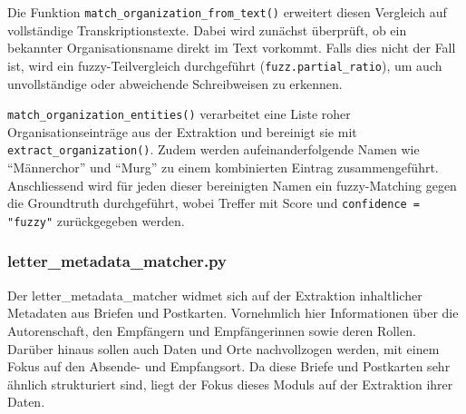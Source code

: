\documentclass[12pt, a4paper, ngerman, bidi=default]{article}
\newcommand{\code}[1]{\colorbox{VeryLightGray}{\texttt{#1}}} %
\begin{document}
Die Funktion \code{match\_organization\_from\_text()} erweitert diesen Vergleich auf vollständige Transkriptionstexte. Dabei wird zunächst überprüft, ob ein bekannter Organisationsname direkt im Text vorkommt. Falls dies nicht der Fall ist, wird ein fuzzy-Teilvergleich durchgeführt (\code{fuzz.partial\_ratio}), um auch unvollständige oder abweichende Schreibweisen zu erkennen.

\code{match\_organization\_entities()} verarbeitet eine Liste roher Organisationseinträge aus der Extraktion und bereinigt sie mit \code{extract\_organization()}. Zudem werden aufeinanderfolgende Namen wie \enquote{Männerchor} und \enquote{Murg} zu einem kombinierten Eintrag zusammengeführt. Anschliessend wird für jeden dieser bereinigten Namen ein fuzzy-Matching gegen die Groundtruth durchgeführt, wobei Treffer mit Score und \code{confidence = "fuzzy"} zurückgegeben werden.

\subsubsection{letter\_metadata\_matcher.py}\label{subsection:letter_metadata_matcher}

Der letter\_metadata\_matcher widmet sich auf der Extraktion inhaltlicher Metadaten aus Briefen und Postkarten. Vornehmlich hier Informationen über die Autorenschaft, den Empfängern und Empfängerinnen sowie deren Rollen. Darüber hinaus sollen auch Daten und Orte nachvollzogen werden, mit einem Fokus auf den Absende- und Empfangsort. Da diese Briefe und Postkarten sehr ähnlich strukturiert sind, liegt der Fokus dieses Moduls auf der Extraktion ihrer Daten.
\end{document}
